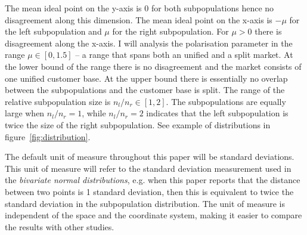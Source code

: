 \documentclass[preprint, 12pt]{elsarticle}
\begin{document}
The mean ideal point on the y-axis is 0 for both subpopulations hence no disagreement along this dimension. The mean ideal point on the x-axis is $-\mu$ for the left subpopulation and $\mu$ for the right subpopulation. For $\mu > 0$ there is disagreement along the x-axis. I will analysis the polarisation parameter in the range $\mu \in [0, 1.5]$ -- a range that spans both an unified and a split market. At the lower bound of the range there is no disagreement and the market consists of one unified customer base. At the upper bound there is essentially no overlap between the subpopulations and the customer base is split. The range of the relative subpopulation size is $n_l/n_r \in [1, 2]$. The subpopulations are equally large when $n_l/n_r = 1$, while $n_l/n_r = 2$ indicates that the left subpopulation is twice the size of the right subpopulation. See example of distributions in figure~\ref{fig:distribution}.

The default unit of measure throughout this paper will be standard deviations. This unit of measure will refer to the standard deviation measurement used in the \emph{bivariate normal distributions}, e.g. when this paper reports that the distance between two points is 1 standard deviation, then this is equivalent to twice the standard deviation in the subpopulation distribution. The unit of measure is independent of the space and the coordinate system, making it easier to compare the results with other studies.
\end{document}
